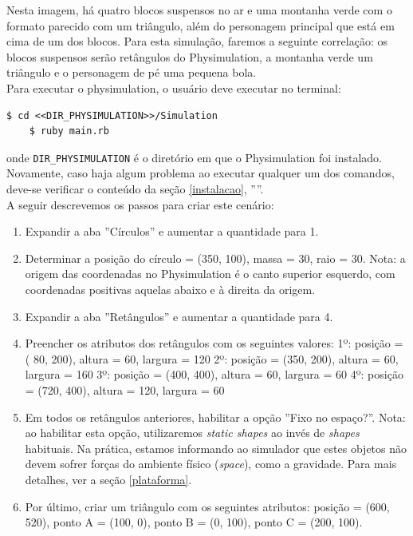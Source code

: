 Nesta imagem, há quatro blocos suspensos no ar e uma montanha verde com o formato parecido com um triângulo, além do personagem principal que está em cima de um dos blocos. Para esta simulação, faremos a seguinte correlação: os blocos suspensos serão retângulos do Physimulation, a montanha verde um triângulo e o personagem de pé uma pequena bola. \\

Para executar o physimulation, o usuário deve executar no terminal:

\begin{Verbatim}[fontsize=\footnotesize]
	$ cd <<DIR_PHYSIMULATION>>/Simulation
	$ ruby main.rb
\end{Verbatim}

\noindent onde {\tt\footnotesize DIR\_PHYSIMULATION} é o diretório em que o Physimulation foi instalado. Novamente, caso haja algum problema ao executar qualquer um dos comandos, deve-se verificar o conteúdo da seção \ref{instalacao}, ''''. \\

A seguir descrevemos os passos para criar este cenário:

\begin{enumerate}
	\item Expandir a aba ''Círculos'' e aumentar a quantidade para 1.
	\item Determinar a posição do círculo = (350, 100), massa = 30, raio = 30. \newline 
		  Nota: a origem das coordenadas no Physimulation é o canto superior esquerdo, com coordenadas positivas aquelas abaixo e à direita da origem.
	\item Expandir a aba ''Retângulos'' e aumentar a quantidade para 4.
	\item Preencher os atributos dos retângulos com os seguintes valores:
		\subitem 1º: posição = ( 80, 200), altura =  60, largura = 120 
		\subitem 2º: posição = (350, 200), altura =  60, largura = 160
		\subitem 3º: posição = (400, 400), altura =  60, largura =  60
		\subitem 4º: posição = (720, 400), altura = 120, largura =  60

	\item Em todos os retângulos anteriores, habilitar a opção ''Fixo no espaço?''. \newline 
		  Nota: ao habilitar esta opção, utilizaremos \textit{static shapes} ao invés de \textit{shapes} habituais. Na prática, estamos informando ao simulador que estes objetos não devem sofrer forças do ambiente físico (\textit{space}), como a gravidade. Para mais detalhes, ver a seção \ref{plataforma}. 

	\item Por último, criar um triângulo com os seguintes atributos: posição = (600, 520), ponto A = (100, 0), ponto B = (0, 100), ponto C = (200, 100). \newline 

\end{enumerate}

